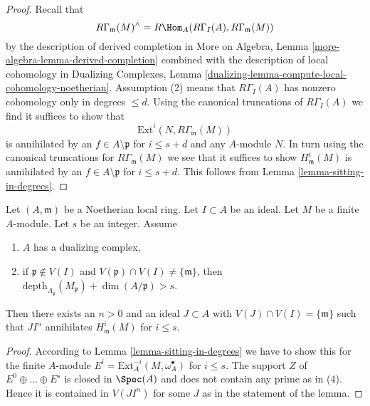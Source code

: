 \begin{proof}
Recall that
$$
R\Gamma_\mathfrak m(M)^\wedge = R\Hom_A(R\Gamma_I(A), R\Gamma_\mathfrak m(M))
$$
by the description of derived completion in
More on Algebra, Lemma \ref{more-algebra-lemma-derived-completion}
combined with the description of local cohomology in
Dualizing Complexes, Lemma
\ref{dualizing-lemma-compute-local-cohomology-noetherian}.
Assumption (2) means that $R\Gamma_I(A)$ has nonzero cohomology
only in degrees $\leq d$. Using the canonical truncations of
$R\Gamma_I(A)$ we find it suffices to show that
$$
\text{Ext}^i(N, R\Gamma_\mathfrak m(M))
$$
is annihilated by an $f \in A \setminus \mathfrak p$ for
$i \leq s + d$ and any $A$-module $N$.
In turn using the canonical truncations for
$R\Gamma_\mathfrak m(M)$ we see that it suffices to show
$H^i_\mathfrak m(M)$ is annihilated by an $f \in A \setminus \mathfrak p$
for $i \leq s + d$. This follows from Lemma \ref{lemma-sitting-in-degrees}.
\end{proof}

\begin{lemma}
\label{lemma-kill-local}
Let $(A, \mathfrak m)$ be a Noetherian local ring.
Let $I \subset A$ be an ideal. Let $M$ be a finite $A$-module.
Let $s$ be an integer. Assume
\begin{enumerate}
\item $A$ has a dualizing complex,
\item if $\mathfrak p \not \in V(I)$ and
$V(\mathfrak p) \cap V(I) \not = \{\mathfrak m\}$, then
$\text{depth}_{A_\mathfrak p}(M_\mathfrak p) + \dim(A/\mathfrak p) > s$.
\end{enumerate}
Then there exists an $n > 0$ and an ideal $J \subset A$
with $V(J) \cap V(I) = \{\mathfrak m\}$ such that $JI^n$ annihilates
$H^i_\mathfrak m(M)$ for $i \leq s$.
\end{lemma}

\begin{proof}
According to Lemma \ref{lemma-sitting-in-degrees}
we have to show this for the finite $A$-module
$E^i = \text{Ext}^{-i}_A(M, \omega_A^\bullet)$
for $i \leq s$. The support $Z$ of $E^0 \oplus \ldots \oplus E^s$
is closed in $\Spec(A)$ and does not contain any prime as in (4).
Hence it is contained in $V(JI^n)$ for some $J$ as in
the statement of the lemma.
\end{proof}

